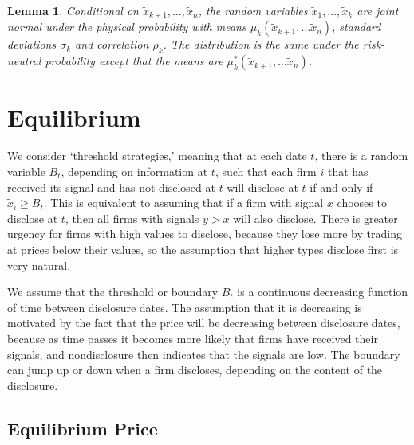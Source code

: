 \documentclass[ecta,nameyear,draft]{econsocart}
\theoremstyle{theorem}
\newtheorem{lemma}{Lemma}
\numberwithin{lemma}{section}
\numberwithin{proposition}{section}
\numberwithin{equation}{section}
\numberwithin{figure}{section}
\begin{document}
\begin{lemma}
Conditional on $\tilde x_{k+1}, \ldots, \tilde x_n$, the random variables $\tilde x_{1}, \ldots, \tilde x_k$ are joint normal under the physical probability with means $\mu_k(\tilde x_{k+1}, \ldots \tilde x_n)$, standard deviations $\sigma_k$ and correlation $\rho_k$.  The distribution is the same under the risk-neutral probability except that the means are $\mu^*_{k}(\tilde x_{k+1}, \ldots \tilde x_n)$.
\end{lemma}

\section{Equilibrium}

We consider `threshold strategies,' meaning that at each date $t$, there is a random variable $B_t$, depending on information at $t$, such that each firm $i$ that has received its signal and has not disclosed at $t$ will disclose at $t$ if and only if $\tilde x_i \ge B_t$.  This is equivalent to assuming that if a firm with signal $x$ chooses to disclose at $t$, then all firms with signals $y>x$ will also  disclose.  There is greater urgency for firms with high values to disclose, because they lose more by trading at prices below their values, so the assumption that higher types disclose first is very natural.

We assume that the threshold or boundary $B_t$ is a continuous decreasing function of time between disclosure dates.  The assumption that it is decreasing is motivated by the fact that the price will be decreasing between disclosure dates, because as time passes it becomes more likely that firms have received their signals, and nondisclosure then indicates that the signals are low.  The boundary can jump up or down when a firm discloses, depending on the content of the disclosure.

%
\subsection{Equilibrium Price}
%
\end{document}
